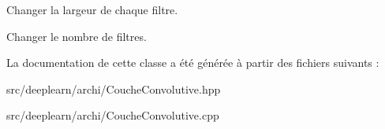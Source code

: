 Changer la largeur de chaque filtre. 

Changer le nombre de filtres. 

La documentation de cette classe a été générée à partir des fichiers suivants \+:\begin{DoxyCompactItemize}
\item 
src/deeplearn/archi/Couche\+Convolutive.\+hpp\item 
src/deeplearn/archi/Couche\+Convolutive.\+cpp\end{DoxyCompactItemize}

